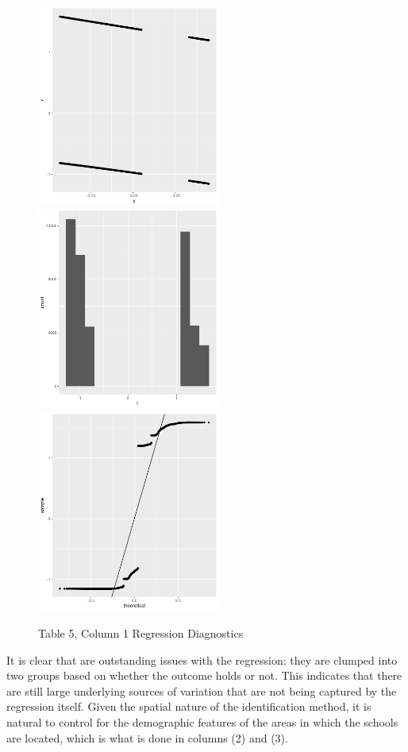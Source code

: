 \documentclass{article}
\begin{document}
\begin{figure}[!hbtp]
\centering
\caption{Table 5, Column 1 Regression Diagnostics}
\includegraphics[width=6cm]{../explore/Output/diagnostics/edu_OOSLogit1Plot.pdf}
\includegraphics[width=6cm]{../explore/Output/diagnostics/edu_OOSLogit1Hist.pdf}
\includegraphics[width=6cm]{../explore/Output/diagnostics/edu_OOSLogit1QQ.pdf}
\end{figure} 
It is clear that are outstanding issues with the regression: they are clumped into two groups based on whether the outcome holds or not. This indicates that there are still large underlying sources of variation that are not being captured by the regression itself. Given the spatial nature of the identification method, it is natural to control for the demographic features of the areas in which the schools are located, which is what is done in columns (2) and (3). 
\end{document}
